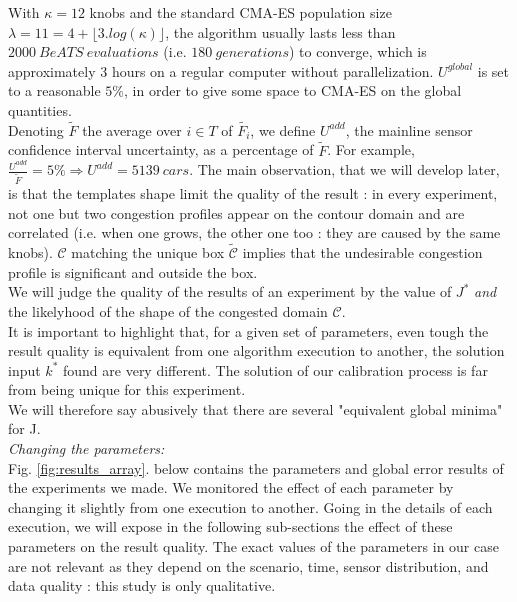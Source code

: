 With $\kappa=12$ knobs and the standard CMA-ES population size $\lambda=11=4+\lfloor3.log(\kappa)\rfloor$, the algorithm usually lasts less than $2000\ BeATS\ evaluations$ (i.e. $180\ generations$) to converge, which is  approximately 3 hours on a regular computer without parallelization.
$U^{global}$ is set to a reasonable $5\%$, in order to give some space to CMA-ES on the global quantities.\\
Denoting $\widetilde{F}$ the average over $i\in T$ of $\widetilde{F_{i}}$, we define $U^{add}$, the mainline sensor confidence interval uncertainty, as a percentage of $\widetilde{F}$. For example, $\frac{U^{add}}{\widetilde{F}}=5\% \Rightarrow U^{add}=5139\ cars$.
The main observation, that we will develop later, is that the templates shape limit the quality of the result : in every experiment, not one but two congestion profiles appear on the contour domain and are correlated (i.e. when one grows, the other one too : they are caused by the same knobs).  $\mathscr{C}$ matching the unique box $\widetilde{\mathscr{C}}$ implies that the undesirable congestion profile is significant and outside the box.\\
We will judge the quality of the results of an experiment by the value of $J^{*}$ \emph{and} the likelyhood of the shape of the congested domain $\mathscr{C}$. \\
It is important to highlight that, for a given set of parameters, even tough the result quality is equivalent from one algorithm execution to another, the solution input $k^{*}$ found are very different. The solution of our calibration process is far from being unique for this experiment.\\
We will therefore say abusively that there are several "equivalent global minima" for J.
\\
\emph{Changing the parameters:}\\
Fig. \ref{fig:results_array}. below contains the parameters and global error results of the experiments we made. We monitored the effect of each parameter by changing it slightly from one execution to another. Going in the details of each execution, we will expose in the following sub-sections the effect of these parameters on the result quality. The exact values of the parameters in our case are not relevant as they depend on the scenario, time, sensor distribution, and data quality : this study is only qualitative. 
